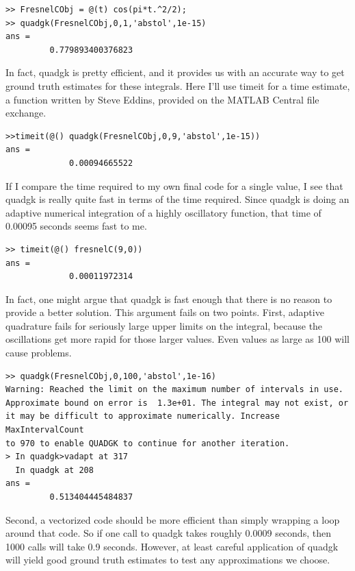 \documentclass[a4paper,11pt]{article}
\begin{document}
\begin{lstlisting}
>> FresnelCObj = @(t) cos(pi*t.^2/2);
>> quadgk(FresnelCObj,0,1,'abstol',1e-15)
ans =
         0.779893400376823
\end{lstlisting}

In fact, quadgk is pretty efficient, and it provides us with an accurate way to get ground truth estimates for these integrals. Here I'll use timeit for a time estimate, a function written by Steve Eddins, provided on the MATLAB Central file exchange.

\begin{lstlisting}
>>timeit(@() quadgk(FresnelCObj,0,9,'abstol',1e-15))
ans =
             0.00094665522
\end{lstlisting}    

If I compare the time required to my own final code for a single value, I see that quadgk is really quite fast in terms of the time required. Since quadgk is doing an adaptive numerical integration of a highly oscillatory function, that time of 0.00095 seconds seems fast to me.

\begin{lstlisting}
>> timeit(@() fresnelC(9,0))
ans =
             0.00011972314
\end{lstlisting}

In fact, one might argue that quadgk is fast enough that there is no reason to provide a better solution. This argument fails on two points. First, adaptive quadrature fails for seriously large upper limits on the integral, because the oscillations get more rapid for those larger values. Even values as large as 100 will cause problems.

\begin{lstlisting}
>> quadgk(FresnelCObj,0,100,'abstol',1e-16)
Warning: Reached the limit on the maximum number of intervals in use.
Approximate bound on error is  1.3e+01. The integral may not exist, or
it may be difficult to approximate numerically. Increase MaxIntervalCount
to 970 to enable QUADGK to continue for another iteration. 
> In quadgk>vadapt at 317
  In quadgk at 208
ans =
         0.513404445484837
\end{lstlisting}

Second, a vectorized code should be more efficient than simply wrapping a loop around that code. So if one call to quadgk takes roughly 0.0009 seconds, then 1000 calls will take 0.9 seconds. However, at least careful application of quadgk will yield good ground truth estimates to test any approximations we choose.
\end{document}
